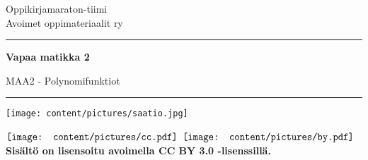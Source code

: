 
\begin{center}
    \begin{doublespace}
        \begin{LARGE}
            \textrm{Oppikirjamaraton-tiimi \\ Avoimet oppimateriaalit ry} \\
        \end{LARGE}
      
        \vspace{0.5cm}
        \hrule height 2pt
        \vspace{1cm}
        \begin{Huge}
            \textbf{\textrm{Vapaa matikka 2}}
        \end{Huge}
      
      
        \vfill
      
        \begin{huge}
            \textrm{MAA2 - Polynomifunktiot}
        \end{huge}
        \vspace{1cm}
        \hrule height 2pt
        \texttt{[image: content/pictures/saatio.jpg]}
    \end{doublespace}
\end{center}

\vfill




\begin{flushright}
    $\vcenter{\hbox{\texttt{[image: content/pictures/cc.pdf]}}}$
    $\vcenter{\hbox{\texttt{[image: content/pictures/by.pdf]}}}$
    \textbf{Sisältö on lisensoitu avoimella CC BY 3.0 -lisenssillä.}
\end{flushright}
